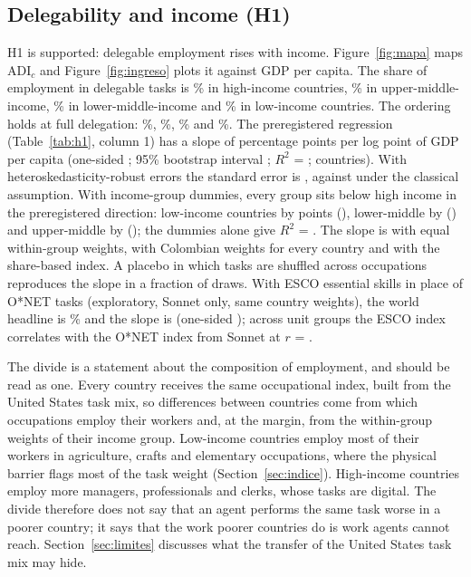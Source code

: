 \subsection{Delegability and income (H1)}

H1 is supported: delegable employment rises with income.
Figure~\ref{fig:mapa} maps $\mathrm{ADI}_c$ and Figure~\ref{fig:ingreso} plots it against GDP per capita.
The share of employment in delegable tasks is \% in high-income countries, \% in upper-middle-income, \% in lower-middle-income and \% in low-income countries.
The ordering holds at full delegation: \%, \%, \% and \%.
The preregistered regression (Table~\ref{tab:h1}, column 1) has a slope of  percentage points per log point of GDP per capita (one-sided ; 95\% bootstrap interval ; $R^2$ = ;  countries).
With heteroskedasticity-robust errors the standard error is , against  under the classical assumption.
With income-group dummies, every group sits below high income in the preregistered direction: low-income countries by  points (), lower-middle by  () and upper-middle by  (); the dummies alone give $R^2$ = .
The slope is  with equal within-group weights,  with Colombian weights for every country and  with the share-based index.
A placebo in which tasks are shuffled across occupations reproduces the slope in a fraction  of draws.
With ESCO essential skills in place of O*NET tasks (exploratory, Sonnet only, same country weights), the world headline is \% and the slope is  (one-sided ); across unit groups the ESCO index correlates with the O*NET index from Sonnet at $r$ = .

The divide is a statement about the composition of employment, and should be read as one.
Every country receives the same occupational index, built from the United States task mix, so differences between countries come from which occupations employ their workers and, at the margin, from the within-group weights of their income group.
Low-income countries employ most of their workers in agriculture, crafts and elementary occupations, where the physical barrier flags most of the task weight (Section~\ref{sec:indice}).
High-income countries employ more managers, professionals and clerks, whose tasks are digital.
The divide therefore does not say that an agent performs the same task worse in a poorer country; it says that the work poorer countries do is work agents cannot reach.
Section~\ref{sec:limites} discusses what the transfer of the United States task mix may hide.

